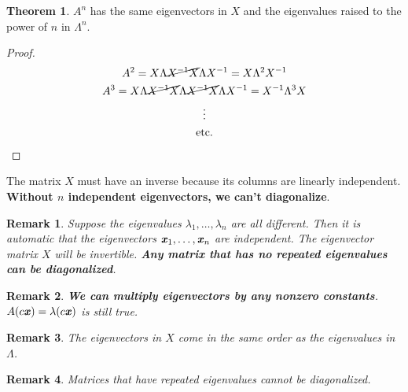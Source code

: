 \documentclass[12pt, letterpaper]{article}
\newcommand{\V}[1]{\textbf{\textit{#1}}}
\newtheorem*{remark}{Remark}
\theoremstyle{definition}
\newtheorem{theorem}{Theorem}
\begin{document}
	
		\begin{theorem}
			$A^n$ has the same eigenvectors in $X$ and the eigenvalues raised to the power of $n$ in $\Lambda^n$.
		\end{theorem}
		\begin{proof}
			\begin{gather*}
				A^2 = X \Lambda \cancel{X^{-1}X} \Lambda X^{-1} = X \Lambda^2 X^{-1} \\
				A^3 = X \Lambda \cancel{X^{-1}X} \Lambda \cancel{X^{-1} X} \Lambda X^{-1} = X^{-1} \Lambda^3 X \\
				\vdots \\
				\text{etc.}
			\end{gather*}
		\end{proof}
		
		The matrix $X$ must have an inverse because its columns are linearly independent. \textbf{Without $n$ independent eigenvectors, we can't diagonalize}.
		
		\begin{remark}
			Suppose the eigenvalues $\lambda_1,\ldots,\lambda_n$ are all different. Then it is automatic that the eigenvectors $\V{x}_1,\ldots,\V{x}_n$ are independent. The eigenvector matrix $X$ will be invertible. \textbf{Any matrix that has no repeated eigenvalues can be diagonalized}.
		\end{remark}
	
		\begin{remark}
			\textbf{We can multiply eigenvectors by any nonzero constants}. $A(c\V{x}) = \lambda (c\V{x})$ is still true.
		\end{remark}

		\begin{remark}
			The eigenvectors in $X$ come in the same order as the eigenvalues in $\Lambda$.
		\end{remark}
	
		\begin{remark}
			Matrices that have repeated eigenvalues cannot be diagonalized.
		\end{remark}
	
\end{document}
